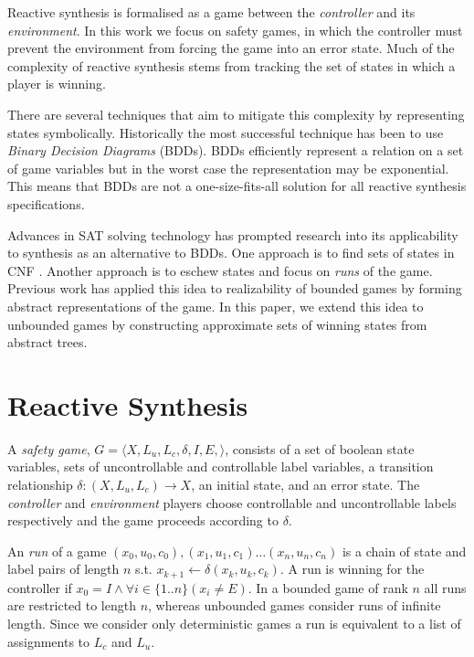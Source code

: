 \documentclass{llncs}
\begin{document}
Reactive synthesis is formalised as a game between the \emph{controller} and
its \emph{environment}. In this work we focus on safety games, in which the
controller must prevent the environment from forcing the game into an error
state.  Much of the complexity of reactive synthesis stems from tracking the
set of states in which a player is winning.

There are several techniques that aim to mitigate this complexity by
representing states symbolically.  Historically the most successful technique
has been to use \emph{Binary Decision Diagrams} (BDDs).  BDDs efficiently
represent a relation on a set of game variables but in the worst case the
representation may be exponential. This means that BDDs are not a
one-size-fits-all solution for all reactive synthesis specifications.

Advances in SAT solving technology has prompted research into its applicability
to synthesis as an alternative to BDDs. One approach is to find sets of states
in CNF \cite{demiurge}. Another approach is to eschew states and focus on
\emph{runs} of the game. Previous work has applied this idea to realizability
of bounded games \cite{narodytska2014} by forming abstract representations of
the game.  In this paper, we extend this idea to unbounded games by
constructing approximate sets of winning states from abstract trees.

\section{Reactive Synthesis}

A \emph{safety game}, $G = \langle X, L_u, L_c, \delta, I, E, \rangle$,
consists of a set of boolean state variables, sets of uncontrollable and
controllable label variables, a transition relationship $\delta : (X, L_u, L_c)
\to X$, an initial state, and an error state. The \emph{controller} and
\emph{environment} players choose controllable and uncontrollable labels
respectively and the game proceeds according to $\delta$. 

An \emph{run} of a game $(x_0, u_0, c_0), (x_1, u_1, c_1) \dots (x_n, u_n,
c_n)$ is a chain of state and label pairs of length $n$ s.t.  $x_{k+1}
\leftarrow \delta(x_k, u_k, c_k)$. A run is winning for the controller if $x_0
= I \land \forall i \in \{1..n\} (x_i \neq E)$. In a bounded game of rank $n$
all runs are restricted to length $n$, whereas unbounded games consider runs of
infinite length. Since we consider only deterministic games a run is equivalent
to a list of assignments to $L_c$ and $L_u$.
\end{document}
